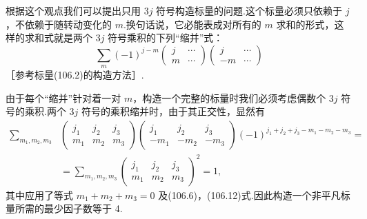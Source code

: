 根据这个观点我们可以提出只用 $3j$ 符号构造标量的问题.这个标量必须只依赖于 $j$，不依赖于随转动变化的 $m$.换句话说，它必能表成对所有的 $m$ 求和的形式，这样的求和式就是两个 $3j$ 符号乘积的下列“缩并”式：
\begin{equation}
  \sum_m(-1)^{j-m}
  \left(\begin{array}{cc}j&\cdots\\m&\cdots\end{array}\right)
  \left(\begin{array}{cc}j&\cdots\\-m&\cdots\end{array}\right)
\end{equation}
［参考标量(106.2)的构造方法］.

由于每个“缩并”针对着一对 $m$，构造一个完整的标量时我们必须考虑偶数个 $3j$ 符号的乘积.两个 $3j$ 符号的乘积缩并时，由于其正交性，显然有
\begin{equation*}
\begin{aligned}
  \sum_{m_1,m_2,m_3}
  &\left(\begin{array}{ccc}j_1&j_2&j_3\\m_1&m_2&m_3\end{array}\right)
  \left(\begin{array}{ccc}j_1&j_2&j_3\\-m_1&-m_2&-m_3\end{array}\right)
  (-1)^{j_1+j_2+j_3-m_1-m_2-m_3}=\\
  &=\sum_{m_1,m_2,m_3}
  \left(\begin{array}{ccc}j_1&j_2&j_3\\m_1&m_2&m_3\end{array}\right)^{\!2}=1,
\end{aligned}
\end{equation*}
其中应用了等式 $m_1+m_2+m_3=0$ 及(106.6)，(106.12)式.因此构造一个非平凡标量所需的最少因子数等于 4.

